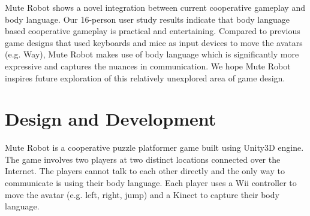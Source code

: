 \documentclass{chi-ext}
\begin{document}

Mute Robot shows a novel integration between current cooperative gameplay and body language. Our 16-person user study results indicate that body language based cooperative gameplay is practical and entertaining. 
Compared to previous game designs that used keyboards and mice as input devices to move the avatars (e.g. Way\cite{Way}), Mute Robot makes use of body language which is significantly more expressive and captures the nuances in communication. 
We hope Mute Robot inspires future exploration of this relatively unexplored area of game design.  

 
  
\section{Design and Development}
Mute Robot is a cooperative puzzle platformer game built using Unity3D\cite{Unity3D} engine. 
The game involves two players at two distinct locations connected over the Internet. 
The players cannot talk to each other directly and the only way to communicate is using their body language. 
Each player uses a Wii\cite{Wii} controller to move the avatar (e.g. left, right, jump) and a Kinect to capture their body language. 
\end{document}
